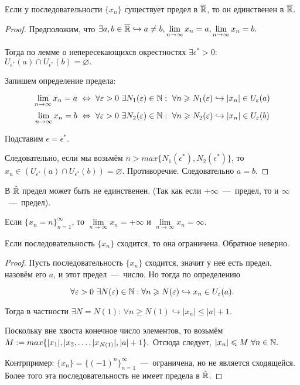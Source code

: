 \begin{theorem}
    Если у последовательности $\{ x_{n} \}$ существует предел в $\overline{\mathbb{R}}$, то он единственен в $\overline{\mathbb{R}}$.
\end{theorem}
\begin{proof}
    Предположим, что $\exists a, b \in \overline{\mathbb{R}} \hookrightarrow a \neq b, \lim\limits_{n\to \infty} x_{n} = a, \lim\limits_{n\to \infty} x_{n} = b.$

    Тогда по лемме о непересекающихся окрестностях $\exists \epsilon^{*} > 0$: $U_{\epsilon^{*}} (a) \cap U_{\epsilon^{*}} (b) = \varnothing.$

    Запишем определение предела:

    $$\lim\limits_{n\to \infty} x_{n} = a \  \Leftrightarrow \   \forall \varepsilon > 0 \  \exists N_{1} (\varepsilon) \in \mathbb{N}: \  \forall n \geqslant N_{1} (\varepsilon) \hookrightarrow |x_{n}| \in U_{\varepsilon}(a)$$
    $$\lim\limits_{n\to \infty} x_{n} = b \  \Leftrightarrow \   \forall \varepsilon > 0 \  \exists N_{2} (\varepsilon) \in \mathbb{N}: \  \forall n \geqslant N_{2} (\varepsilon) \hookrightarrow |x_{n}| \in U_{\varepsilon}(b)$$

    Подставим $\epsilon = \epsilon^{*}.$
    
    Следовательно, если мы возьмём $n > max \{ N_{1} (\epsilon^{*}), N_{2} (\epsilon^{*} )\}$, то $x_{n} \in \left(U_{\epsilon^{*}} (a) \cap U_{\epsilon^{*}} (b)\right) = \varnothing.$ Противоречие. Следовательно $a = b$.
\end{proof}
\begin{note}
    В $\Hat{\mathbb{R}}$ предел может быть не единственен. (Так как если $+\infty$~---~предел, то и $\infty$~---~предел).

    Если $\{ x_{n} = n \}^{\infty}_{n = 1}$, то $ \lim\limits_{n\to \infty} x_{n} = +\infty$ и $ \lim\limits_{n\to \infty} x_{n} = \infty$.
\end{note}
\begin{theorem}
    Если последовательность $\{ x_{n} \}$ сходится, то она ограничена. Обратное неверно.
\end{theorem}
\begin{proof}
    Пусть последовательность $\{ x_{n} \}$ сходится, значит у неё есть предел, назовём его $a$, и этот предел~---~число. Но тогда по определению

    $$ \forall \varepsilon > 0 \  \exists N(\varepsilon) \in \mathbb{N}: \forall n \geqslant N(\varepsilon) \hookrightarrow x_{n} \in U_{\varepsilon} (a).$$

    Тогда в частности $\exists N = N(1)$: $\forall n \geq N(1) \hookrightarrow |x_{n}| \leq |a| + 1.$

    Поскольку вне хвоста конечное число элементов, то возьмём $M := max \{ |x_{1}|, |x_{2}, \ldots, |x_{N(1)}|, \newline |a| + 1\}.$ Отсюда следует, $|x_{n}| \leqslant M \  \forall n \in \mathbb{N}.$

    Контрпример: $\{ x_{n} \} = \{ (-1)^{n} \}^{\infty}_{n = 1}$~---~ограничена, но не является сходящейся. Более того эта последовательность не имеет предела в $\Hat{\mathbb{R}}$.
\end{proof}

